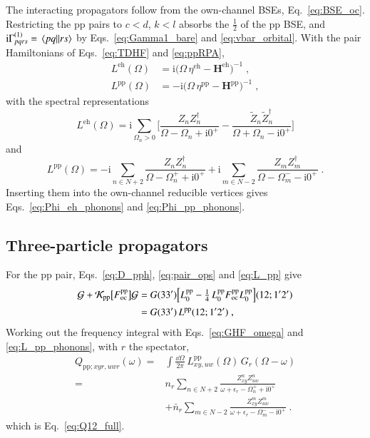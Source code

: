 \documentclass[aip,jcp,reprint,noshowkeys,superscriptaddress]{revtex4-1}
\newcommand{\cK}{\mathcal{K}}
\newcommand{\eps}{\epsilon}
\newcommand{\ii}{\mathrm{i}}
\newcommand{\eh}{\text{eh}}
\newcommand{\pp}{\text{pp}}
\begin{document}
The interacting propagators follow from the own-channel BSEs,
Eq.~\eqref{eq:BSE_oc}. Restricting the $\pp$ pairs to $c<d$, $k<l$
absorbs the $\tfrac12$ of the $\pp$ BSE, and
$\ii\Gamma^{(1)}_{pqrs}=\mel{pq}{}{rs}$ by Eqs.~\eqref{eq:Gamma1_bare}
and \eqref{eq:vbar_orbital}. With the pair Hamiltonians of
Eqs.~\eqref{eq:TDHF} and \eqref{eq:ppRPA},
\begin{equation}
\begin{aligned}
L^{\eh}(\Omega)
&= 
\ii\big(\Omega\,\eta^{\eh}-\mathbf H^{\eh}\big)^{-1} \;,
\\
L^{\pp}(\Omega)
&=  
-\ii\big(\Omega\,\eta^{\pp}-\mathbf H^{\pp}\big)^{-1} \;,
\end{aligned}
\nonumber
\end{equation}
with the spectral representations
\begin{equation}
L^{\eh}(\Omega)
=
\ii\sum_{\Omega_n>0}
\bigg[
\frac{Z_nZ_n^\dagger}{\Omega-\Omega_n+\ii0^+}
-
\frac{\tilde Z_n\tilde Z_n^\dagger}{\Omega+\Omega_n-\ii0^+}
\bigg]
\label{eq:L_eh_phonons}
\end{equation}
and
\begin{equation}
\label{eq:L_pp_phonons}
L^{\pp}(\Omega)
= 
-\ii\sum_{n\in N+2}
\frac{Z_nZ_n^\dagger}{\Omega-\Omega^{+}_n+\ii0^+}
+
\ii\sum_{m\in N-2}
\frac{Z_mZ_m^\dagger}{\Omega-\Omega^{-}_m-\ii0^+} \;.
\end{equation}
Inserting them into the own-channel reducible vertices gives
Eqs.~\eqref{eq:Phi_eh_phonons} and \eqref{eq:Phi_pp_phonons}.

\subsection{Three-particle propagators}
For the $\pp$ pair,
Eqs.~\eqref{eq:D_pph}, \eqref{eq:pair_ops} and \eqref{eq:L_pp} 
give
\begin{equation}
\begin{aligned}
\mathcal G+\cK_{\pp}\big[F^{\pp}_{\rm oc}\big]\mathcal G
={}&
G(33')\Big[L^{\pp}_0
-\tfrac14\,L^{\pp}_0F^{\pp}_{\rm oc}L^{\pp}_0\Big](12;1'2')
\\
={}&
G(33')\,L^{\pp}(12;1'2') \;,
\end{aligned}
\label{eq:one_pair_pp}
\end{equation}
Working out the frequency integral with
Eqs.~\eqref{eq:GHF_omega} and \eqref{eq:L_pp_phonons}, with $r$ the spectator,
\begin{equation}
\begin{aligned}
Q_{\pp;xyr,uwr}(\omega)
={}&
\int\frac{\dd\Omega}{2\pi}\,
L^{\pp}_{xy,uw}(\Omega)\,G_r(\Omega-\omega)
\\
={}&
n_r\sum_{n\in N+2}
\frac{Z^n_{xy}Z^{n}_{uw}}{\omega+\eps_r-\Omega^{+}_n+\ii0^+}
\\
&+
\bar n_r\sum_{m\in N-2}
\frac{Z^m_{xy}Z^{m}_{uw}}{\omega+\eps_r-\Omega^{-}_m-\ii0^+} \;.
\end{aligned}
\nonumber
\end{equation}
which is Eq.~\eqref{eq:Q12_full}.
\end{document}
